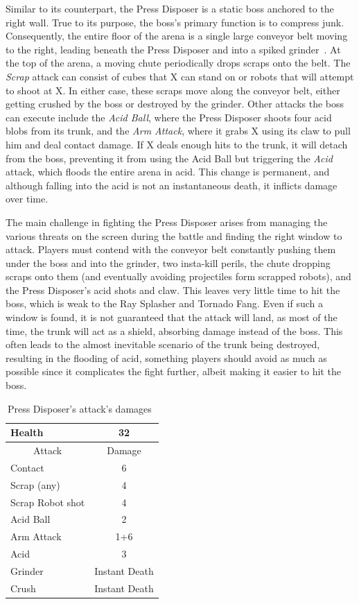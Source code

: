 Similar to its counterpart, the Press Disposer is a static boss anchored to the right wall. True to its purpose, the boss's primary function is to compress junk. Consequently, the entire floor of the arena is a single large conveyor belt moving to the right, leading beneath the Press Disposer and into a spiked grinder~\cite{wiki:Press_disposer}. At the top of the arena, a moving chute periodically drops scraps onto the belt. The \emph{Scrap} attack can consist of cubes that X can stand on or robots that will attempt to shoot at X. In either case, these scraps move along the conveyor belt, either getting crushed by the boss or destroyed by the grinder. Other attacks the boss can execute include the \emph{Acid Ball}, where the Press Disposer shoots four acid blobs from its trunk, and the \emph{Arm Attack}, where it grabs X using its claw to pull him and deal contact damage. If X deals enough hits to the trunk, it will detach from the boss, preventing it from using the Acid Ball but triggering the \emph{Acid} attack, which floods the entire arena in acid. This change is permanent, and although falling into the acid is not an instantaneous death, it inflicts damage over time.


The main challenge in fighting the Press Disposer arises from managing the various threats on the screen during the battle and finding the right window to attack. Players must contend with the conveyor belt constantly pushing them under the boss and into the grinder, two insta-kill perils, the chute dropping scraps onto them (and eventually avoiding projectiles form scrapped robots), and the Press Disposer's acid shots and claw. This leaves very little time to hit the boss, which is weak to the Ray Splasher and Tornado Fang. Even if such a window is found, it is not guaranteed that the attack will land, as most of the time, the trunk will act as a shield, absorbing damage instead of the boss. This often leads to the almost inevitable scenario of the trunk being destroyed, resulting in the flooding of acid, something players should avoid as much as possible since it complicates the fight further, albeit making it easier to hit the boss.

\begin{table}[htp]
	\centering
	\begin{tabular}[h]{l c}
		\toprule
		Health  & 32\\
		\midrule
		\multicolumn{1}{c}{Attack} & \multicolumn{1}{c}{Damage}\\
		Contact & 6\\
		Scrap (any)& 4\\
		Scrap Robot shot& 4\\
		Acid Ball& 2\\
		Arm Attack& 1+6\\
		Acid& 3\\
		Grinder& Instant Death\\
		Crush& Instant Death\\
		\bottomrule
	\end{tabular}
	\caption{Press Disposer's attack's damages~\cite{wiki:Byte,book:Compendium}}
\end{table} 

